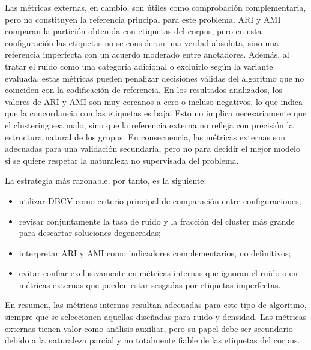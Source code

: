 \documentclass[11pt]{article}
\begin{document}
Las métricas externas, en cambio, son útiles como comprobación complementaria, pero no constituyen la referencia principal para este problema. ARI y AMI comparan la partición obtenida con etiquetas del corpus, pero en esta configuración las etiquetas no se consideran una verdad absoluta, sino una referencia imperfecta con un acuerdo moderado entre anotadores. Además, al tratar el ruido como una categoría adicional o excluirlo según la variante evaluada, estas métricas pueden penalizar decisiones válidas del algoritmo que no coinciden con la codificación de referencia. En los resultados analizados, los valores de ARI y AMI son muy cercanos a cero o incluso negativos, lo que indica que la concordancia con las etiquetas es baja. Esto no implica necesariamente que el clustering sea malo, sino que la referencia externa no refleja con precisión la estructura natural de los grupos. En consecuencia, las métricas externas son adecuadas para una validación secundaria, pero no para decidir el mejor modelo si se quiere respetar la naturaleza no supervisada del problema.

La estrategia más razonable, por tanto, es la siguiente:

\begin{itemize}
    \item utilizar DBCV como criterio principal de comparación entre configuraciones;
    \item revisar conjuntamente la tasa de ruido y la fracción del cluster más grande para descartar soluciones degeneradas;
    \item interpretar ARI y AMI como indicadores complementarios, no definitivos;
    \item evitar confiar exclusivamente en métricas internas que ignoran el ruido o en métricas externas que pueden estar sesgadas por etiquetas imperfectas.
\end{itemize}

En resumen, las métricas internas resultan adecuadas para este tipo de algoritmo, siempre que se seleccionen aquellas diseñadas para ruido y densidad. Las métricas externas tienen valor como análisis auxiliar, pero su papel debe ser secundario debido a la naturaleza parcial y no totalmente fiable de las etiquetas del corpus.
\end{document}
